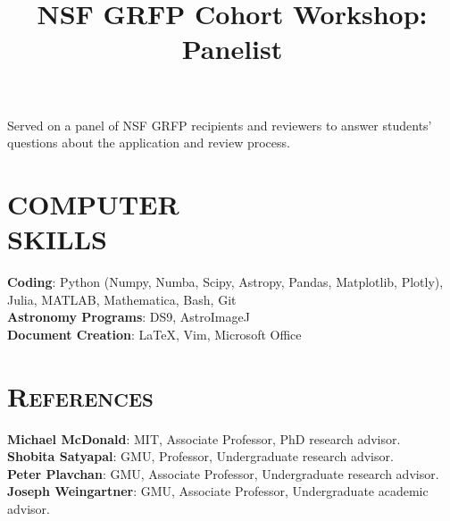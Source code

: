 \documentclass[marg, centered]{res}
\begin{document}
\begin{resume}
\title{\textbf{NSF GRFP Cohort Workshop: Panelist}}
\begin{position}
Served on a panel of NSF GRFP recipients and reviewers to answer students' questions about the application and review process.
\end{position}


\section{COMPUTER\\SKILLS}

\textbf{Coding}{: Python (Numpy, Numba, Scipy, Astropy, Pandas, Matplotlib, Plotly),
Julia, MATLAB, Mathematica, Bash, Git} \\ 
\textbf{Astronomy Programs}{: DS9, AstroImageJ} \\
\textbf{Document Creation}{: \LaTeX, Vim, Microsoft Office} \\


\section{{\scshape \bfseries References}}
\textbf{Michael McDonald}{: MIT, Associate Professor, PhD research advisor.}\\
\textbf{Shobita Satyapal}{: GMU, Professor, Undergraduate research advisor.}\\
\textbf{Peter Plavchan}{: GMU, Associate Professor, Undergraduate research advisor.}\\
\textbf{Joseph Weingartner}{: GMU,  Associate Professor, Undergraduate academic advisor.}\\

\end{resume}
\end{document}
